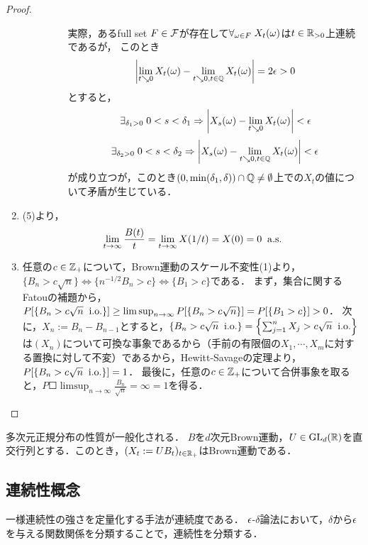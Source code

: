 \documentclass[uplatex,dvipdfmx]{jsreport}
\begin{document}
\begin{proof}
\begin{enumerate}
\begin{description}
\begin{enumerate}[(a)]
                実際，あるfull set $F\in\mathcal{F}$が存在して$\forall_{\omega\in F}\;X_t(\omega)$は$t\in\mathbb{R}_{>0}$上連続であるが，
                このとき\[\left|\lim_{t\searrow0}X_t(\omega)-\lim_{t\searrow 0,t\in\mathbb{Q}}X_t(\omega)\right|=2\epsilon>0\]とすると，
                \[\exists_{\delta_1>0}\;0<s<\delta_1\Rightarrow\left|X_s(\omega)-\lim_{t\searrow0}X_t(\omega)\right|<\epsilon\]
                \[\exists_{\delta_2>0}\;0<s<\delta_2\Rightarrow\left|X_s(\omega)-\lim_{t\searrow 0,t\in\mathbb{Q}}X_t(\omega)\right|<\epsilon\]
                が成り立つが，このとき$(0,\min(\delta_1,\delta))\cap\mathbb{Q}\ne\emptyset$上での$X_t$の値について矛盾が生じている．
            \end{enumerate}
        \end{description}
        \item (5)より，
        \[\lim_{t\to\infty}\frac{B(t)}{t}=\lim_{t\to\infty}X(1/t)=X(0)=0\;\;\mathrm{a.s.}\]
        \item 任意の$c\in\mathbb{Z}_+$について，Brown運動のスケール不変性(1)より，$\{B_n>c\sqrt{n}\}\Leftrightarrow\{n^{-1/2}B_n>c\}\Leftrightarrow\{B_1>c\}$である．
        まず，集合に関するFatouの補題から，$P[\left\{B_n>c\sqrt{n}\;\;\mathrm{i.o.}\right\}]\ge\limsup_{n\to\infty}P[\left\{B_n>c\sqrt{n}\right\}]=P[\left\{B_1>c\right\}]>0$．
        次に，$X_n:=B_n-B_{n-1}$とすると，$\left\{B_n>c\sqrt{n}\;\;\mathrm{i.o.}\right\}=\left\{\sum^n_{j=1}X_j>c\sqrt{n}\;\;\mathrm{i.o.}\right\}$は$(X_n)$について可換な事象であるから（手前の有限個の$X_1,\cdots,X_m$に対する置換に対して不変）であるから，Hewitt-Savageの定理より，$P[\left\{B_n>c\sqrt{n}\;\;\mathrm{i.o.}\right\}]=1$．
        最後に，任意の$c\in\mathbb{Z}_+$について合併事象を取ると，$P\Square{\limsup_{n\to\infty}\frac{B_n}{\sqrt{n}}=\infty}=1$を得る．
    \end{enumerate}
\end{proof}

\begin{proposition}
    多次元正規分布の性質が一般化される．
    $B$を$d$次元Brown運動，$U\in\mathrm{GL}_d(\mathbb{R})$を直交行列とする．このとき，$(X_t:=UB_t)_{t\in\mathbb{R}_+}$はBrown運動である．
\end{proposition}

\subsection{連続性概念}

\begin{tcolorbox}[colframe=ForestGreen, colback=ForestGreen!10!white,breakable,colbacktitle=ForestGreen!40!white,coltitle=black,fonttitle=\bfseries\sffamily,
title=]
    一様連続性の強さを定量化する手法が連続度である．
    $\epsilon$-$\delta$論法において，$\delta$から$\epsilon$を与える関数関係を分類することで，連続性を分類する．
\end{tcolorbox}
\end{document}
